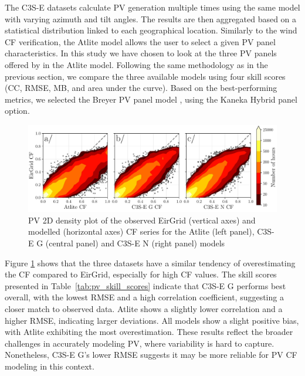 \documentclass[a4paper, 11pt]{article}
\begin{document}
The C3S-E datasets calculate PV generation multiple times using the same model with varying azimuth and tilt angles. The results are then aggregated based on a statistical distribution linked to each geographical location. Similarly to the wind CF verification, the Atlite model allows the user to select a given PV panel characteristics. In this study we have chosen to look at the three PV panels offered by in the Atlite model. Following the same methodology as in the previous section, we compare the three available models using four skill scores (CC, RMSE, MB, and area under the curve). Based on the best-performing metrics, we selected the Breyer PV panel model \cite{beyer2004pv}, using the Kaneka Hybrid panel option.

\begin{figure}[h!]
	\centering
	\includegraphics[width=\textwidth]{verification_pv_contour}
	\caption{PV 2D density plot of the observed EirGrid (vertical axes) and modelled (horizontal axes) CF series for the Atlite  (left panel), C3S-E G (central panel) and C3S-E N (right panel) models}	
	\label{fig:solar_verification_contour}
\end{figure}

Figure \ref{fig:solar_verification_contour} shows that the three datasets have a similar tendency of overestimating the CF compared to EirGrid, especially for high CF values. The skill scores presented in Table~\ref{tab:pv_skill_scores} indicate that C3S-E G performs best overall, with the lowest RMSE and a high correlation coefficient, suggesting a closer match to observed data. Atlite shows a slightly lower correlation and a higher RMSE, indicating larger deviations. All models show a slight positive bias, with Atlite exhibiting the most overestimation. These results reflect the broader challenges in accurately modeling PV, where variability is hard to capture. Nonetheless, C3S-E G’s lower RMSE suggests it may be more reliable for PV CF modeling in this context.
\end{document}
